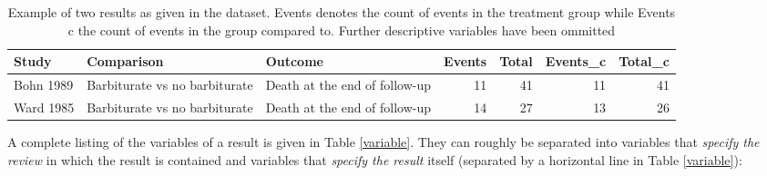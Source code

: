 \begin{table}[ht]
\centering
\begingroup\scriptsize
\begin{tabular}{lllrrrr}
  \hline
Study & Comparison & Outcome & Events & Total & Events\_c & Total\_c \\ 
  \hline
Bohn 1989 & Barbiturate vs no barbiturate & Death at the end of follow-up & 11 & 41 & 11 & 41 \\ 
  Ward 1985 & Barbiturate vs no barbiturate & Death at the end of follow-up & 14 & 27 & 13 & 26 \\ 
   \hline
\end{tabular}
\endgroup
\caption{Example of two results as given in the dataset. Events denotes the count of events in the treatment group while Events c the count of events in the group compared to. Further descriptive variables have been ommitted} 
\label{barbiturate.row}
\end{table}


A complete listing of the variables of a result is given in Table \ref{variable}. They can roughly be separated into variables that \textit{specify the review} in which the result is contained and variables that \textit{specify the result} itself (separated by a horizontal line in Table \ref{variable}):

